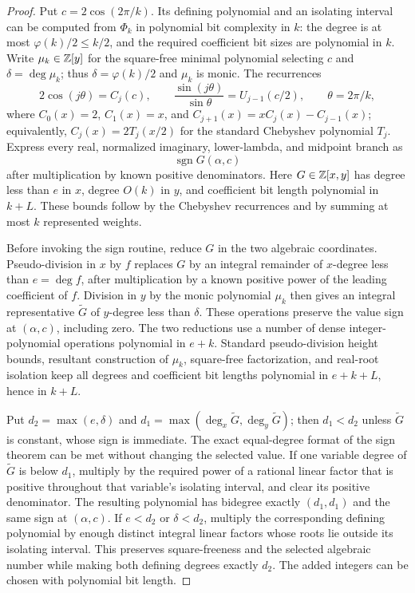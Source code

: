 \begin{proof}
Put $c=2\cos(2\pi/k)$.  Its defining polynomial and an isolating interval can
be computed from $\Phi_k$ in polynomial bit complexity in $k$: the degree is
at most $\varphi(k)/2\le k/2$, and the required coefficient bit sizes are
polynomial in $k$.  Write $\mu_k\in\mathbb Z[y]$ for the square-free minimal
polynomial selecting $c$ and $\delta=\deg\mu_k$; thus
$\delta=\varphi(k)/2$ and $\mu_k$ is monic.  The recurrences
\[
  2\cos(j\theta)=C_j(c),\qquad
  \frac{\sin(j\theta)}{\sin\theta}=U_{j-1}(c/2),
  \qquad \theta=2\pi/k,
\]
where $C_0(x)=2$, $C_1(x)=x$, and
$C_{j+1}(x)=xC_j(x)-C_{j-1}(x)$; equivalently,
$C_j(x)=2T_j(x/2)$ for the standard Chebyshev polynomial $T_j$.  Express
every real, normalized imaginary, lower-lambda, and midpoint branch
as
\begin{equation}
  \operatorname{sgn} G(\alpha,c)                                        \label{eq:bivariate-sign}
\end{equation}
after multiplication by known positive denominators.  Here
$G\in\mathbb Z[x,y]$ has degree less than $e$ in $x$, degree $O(k)$ in $y$, and
coefficient bit length polynomial in $k+L$.  These bounds follow by the
Chebyshev recurrences and by summing at most $k$ represented weights.

Before invoking the sign routine, reduce $G$ in the two algebraic
coordinates.  Pseudo-division in $x$ by $f$ replaces $G$ by an integral
remainder of $x$-degree less than $e=\deg f$, after multiplication by a known
positive power of the leading coefficient of $f$.  Division in $y$ by
the monic polynomial $\mu_k$ then gives an integral representative
$\widetilde G$ of $y$-degree less than $\delta$.  These operations preserve
the value sign at $(\alpha,c)$, including zero.  The two reductions use a
number of dense integer-polynomial operations polynomial in $e+k$.
Standard pseudo-division height bounds, resultant construction of $\mu_k$,
square-free factorization, and real-root isolation keep all degrees and
coefficient bit lengths polynomial in $e+k+L$, hence in $k+L$.

Put $d_2=\max(e,\delta)$ and
$d_1=\max(\deg_x\widetilde G,\deg_y\widetilde G)$; then $d_1<d_2$ unless
$\widetilde G$ is constant, whose sign is immediate.  The exact equal-degree
format of the sign theorem can be met without changing the selected value.
If one variable degree of $\widetilde G$ is below $d_1$, multiply by the
required power of a rational linear factor that is positive throughout that
variable's isolating interval, and clear its positive denominator.  The
resulting polynomial has bidegree exactly $(d_1,d_1)$ and the same sign at
$(\alpha,c)$.  If $e<d_2$ or $\delta<d_2$, multiply the corresponding
defining polynomial by enough distinct integral linear factors whose roots
lie outside its isolating interval.  This preserves square-freeness and the
selected algebraic number while making both defining degrees exactly $d_2$.
The added integers can be chosen with polynomial bit length.


\end{proof}
